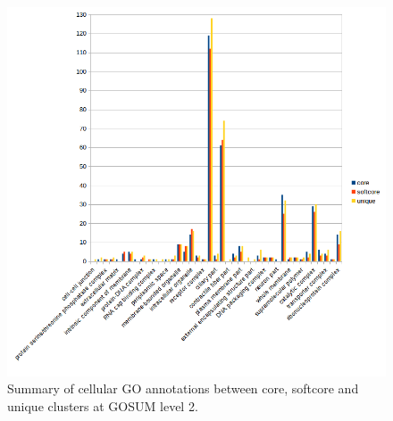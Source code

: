 \documentclass[12pt]{article}
\begin{document}
\begin{figure} 
\includegraphics[scale=.8]{3Aug18_cluster-investigation/figures/Gambi-gosum2-cell-graph.png} 
\caption{Summary of cellular GO annotations between core, softcore and unique clusters at GOSUM level 2.} 
\label{fig:}
\end{figure} 
\FloatBarrier
\end{document}
